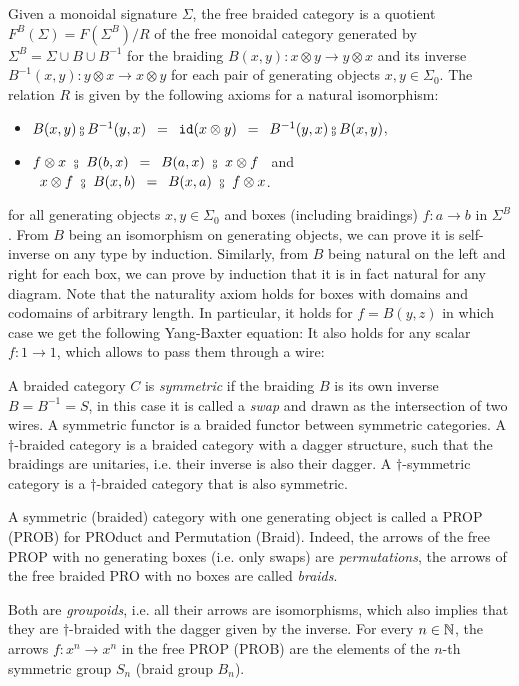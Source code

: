 Given a monoidal signature $\Sigma$, the free braided category is a quotient $F^B(\Sigma) = F(\Sigma^B) / R$ of the free monoidal category generated by $\Sigma^B =  \Sigma \cup B \cup B^{-1}$ for the braiding $B(x, y) : x \otimes y \to y \otimes x$ and its inverse $B^{-1}(x, y) : y \otimes x \to x \otimes y$ for each pair of generating objects $x, y \in \Sigma_0$.
The relation $R$ is given by the following axioms for a natural isomorphism:
\begin{itemize}
\item $B(x, y) \fcmp B^{-1}(y, x)
\s = \s \id(x \otimes y) \s = \s B^{-1}(y, x) \fcmp B(x, y)$,
\item $f \otimes x \ \fcmp \ B(b, x) \s = \s B(a, x) \ \fcmp \ x \otimes f \s$ and $\s x \otimes f \ \fcmp \ B(x, b) \s = \s B(x, a) \ \fcmp \ f \otimes x$.
\begin{center}
\hfill
{}
\end{center}
\end{itemize}
for all generating objects $x, y \in \Sigma_0$ and boxes (including braidings) $f : a \to b$ in $\Sigma^B$.
From $B$ being an isomorphism on generating objects, we can prove it is self-inverse on any type by induction.
Similarly, from $B$ being natural on the left and right for each box, we can prove by induction that it is in fact natural for any diagram.
Note that the naturality axiom holds for boxes with domains and codomains of arbitrary length.
In particular, it holds for $f = B(y, z)$ in which case we get the following Yang-Baxter equation:
It also holds for any scalar $f : 1 \to 1$, which allows to pass them through a wire:

A braided category $C$ is \emph{symmetric} if the braiding $B$ is its own inverse $B = B^{-1} = S$, in this case it is called a \emph{swap} and drawn as the intersection of two wires.
A symmetric functor is a braided functor between symmetric categories.
A $\dagger$-braided category is a braided category with a dagger structure, such that the braidings are unitaries, i.e. their inverse is also their dagger.
A $\dagger$-symmetric category is a $\dagger$-braided category that is also symmetric.

\begin{remark}
A symmetric (braided) category with one generating object is called a PROP (PROB) for PROduct and Permutation (Braid).
Indeed, the arrows of the free PROP with no generating boxes (i.e. only swaps) are \emph{permutations}, the arrows of the free braided PRO with no boxes are called \emph{braids}.

Both are \emph{groupoids}, i.e. all their arrows are isomorphisms, which also implies that they are $\dagger$-braided with the dagger given by the inverse.
For every $n \in \mathbb{N}$, the arrows $f : x^n \to x^n$ in the free PROP (PROB) are the elements of the $n$-th symmetric group $S_n$ (braid group $B_n$).
\end{remark}

